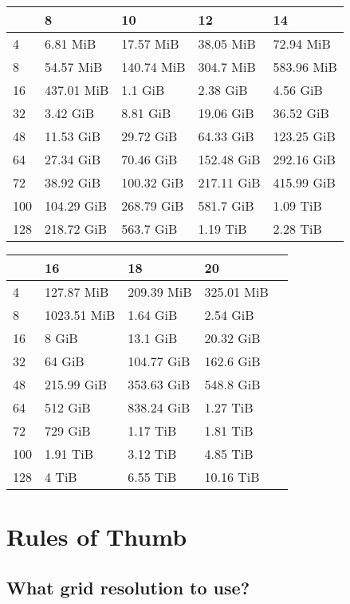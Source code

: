 \begin{tabular}{lllll}
\toprule
{} &          8  &          10 &          12 &          14  \\
\midrule
4   &    6.81 MiB &   17.57 MiB &   38.05 MiB &   72.94 MiB  \\
8   &   54.57 MiB &  140.74 MiB &   304.7 MiB &  583.96 MiB  \\
16  &  437.01 MiB &     1.1 GiB &    2.38 GiB &    4.56 GiB  \\
32  &    3.42 GiB &    8.81 GiB &   19.06 GiB &   36.52 GiB  \\
48  &   11.53 GiB &   29.72 GiB &   64.33 GiB &  123.25 GiB  \\
64  &   27.34 GiB &   70.46 GiB &  152.48 GiB &  292.16 GiB  \\
72  &   38.92 GiB &  100.32 GiB &  217.11 GiB &  415.99 GiB  \\
100 &  104.29 GiB &  268.79 GiB &   581.7 GiB &    1.09 TiB  \\
128 &  218.72 GiB &   563.7 GiB &    1.19 TiB &    2.28 TiB  \\
\bottomrule
\end{tabular}

\begin{tabular}{lllll}
\toprule
{}  &               16 &          18 &          20 \\ 
\midrule
4   &       127.87 MiB &  209.39 MiB &  325.01 MiB \\
8   &      1023.51 MiB &    1.64 GiB &    2.54 GiB \\
16  &            8 GiB &    13.1 GiB &   20.32 GiB \\
32  &           64 GiB &  104.77 GiB &   162.6 GiB \\
48  &       215.99 GiB &  353.63 GiB &   548.8 GiB \\
64  &          512 GiB &  838.24 GiB &    1.27 TiB \\
72  &          729 GiB &    1.17 TiB &    1.81 TiB \\
100 &         1.91 TiB &    3.12 TiB &    4.85 TiB \\
128 &            4 TiB &    6.55 TiB &   10.16 TiB \\
\bottomrule
\end{tabular}


\section{Rules of Thumb}
\subsection{What grid resolution to use?}
